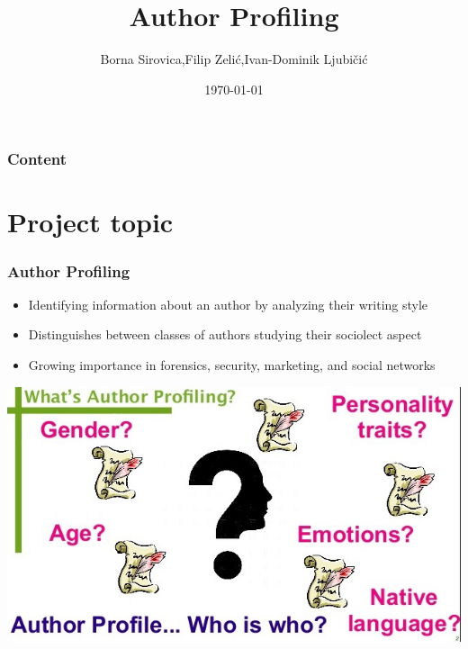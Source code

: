 \documentclass[slidestop,compress,11pt,xcolor=dvipsnames]{beamer}
\title[Author Profiling]{Author Profiling} %
\author{Borna Sirovica,Filip Zelić,Ivan-Dominik Ljubičić} %
\institute[FER] %
{
Fakultet elektrotehnike i računarstva \\ %
\medskip

}
\date{\today} %
\begin{document}
\begin{frame}
\titlepage %
\end{frame}

\begin{frame}
\frametitle{Content} %
\tableofcontents %
\end{frame}


\section{Project topic} %

\begin{frame}
\frametitle{Author Profiling}
\begin{itemize}
	\item Identifying information about an author by analyzing their writing style
	\item Distinguishes between classes of authors studying their sociolect aspect
	\item Growing importance in forensics, security, marketing, and social networks
\end{itemize}
	\vspace{3mm}
	\centerline{\includegraphics[scale=0.35]{author-profiling-task}}

\end{frame}
\end{document}
